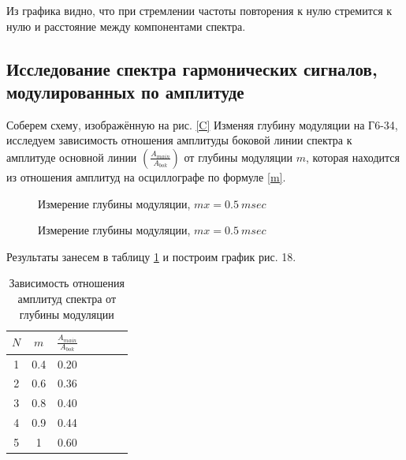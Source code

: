   
  Из графика видно, что при стремлении частоты повторения к нулю стремится к нулю и расстояние между компонентами спектра.  
  
  \subsection{Исследование спектра гармонических сигналов, модулированных по амплитуде}
  	
  	Соберем схему, изображённую на рис. \ref{C}
  	Изменяя глубину модуляции на Г6-34, исследуем зависимость
  	отношения амплитуды боковой линии спектра к амплитуде основной линии $ \left(\frac{A_{main}}{A_{bok}}\right) $ от глубины модуляции $ m $, которая находится из отношения амплитуд на осциллографе по формуле \eqref{m}.
  	
  	 \begin{figure}[h!]
  	\begin{minipage}[h]{0.5\linewidth}
  		\caption{Измерение глубины модуляции, $mx = 0.5 \:  msec$}
  		\label{A_tau}
  	\end{minipage}
  	\begin{minipage}[h]{0.5\linewidth}
  		\caption{Измерение глубины модуляции, $mx = 0.5 \:  msec$}
  		\label{A_f}
  	\end{minipage}
  \end{figure}
  	
  	Результаты занесем в таблицу \ref{C_table} и построим график рис. 18. 
  	
  	
  	\begin{table}[h]
  		\caption{Зависимость отношения амплитуд спектра от глубины модуляции}
  		\begin{center}
  			\begin{tabular}{|c|c|c|c|c|c|c|}
  				\hline
  				$ N $  & $ m $ & $ \frac{A_{main}}{A_{bok}} $\\
  				\hline
  			1 & 0.4 & 0.20  \\
  				\hline
  			2 & 0.6 & 0.36  \\
  				\hline
  			3 & 0.8 & 0.40  \\
  				\hline
  			4 & 0.9 & 0.44  \\
  				\hline
  			5 & 1 & 0.60     \\
  				\hline
  			\end{tabular}
  		\end{center}
  		\label{C_table}
  	\end{table}
  	
